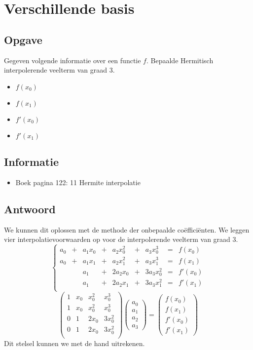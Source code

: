 \documentclass[examenvragen.tex]{subfiles}
\begin{document}
\section{Verschillende basis}
\subsection{Opgave}
Gegeven volgende informatie over een functie $f$. Bepaalde Hermitisch interpolerende veelterm van graad $3$.
\begin{multicols}{4}
\begin{itemize}
\item $f(x_0)$
\item $f(x_1)$
\item $f'(x_0)$
\item $f'(x_1)$
\end{itemize}
\end{multicols}
\subsection{Informatie}
\begin{itemize}
\item Boek pagina 122: 11 Hermite interpolatie
\end{itemize}

\subsection{Antwoord}
We kunnen dit oplossen met de methode der onbepaalde co\"effici\"enten. We leggen vier interpolatievoorwaarden op voor de interpolerende veelterm van graad $3$.
\[
\left\{
\begin{array}{ccccccccc}
a_0 &+& a_1x_0 &+& a_2x_0^{2} &+& a_3x_{0}^{3} &=& f(x_0)\\
a_0 &+& a_1x_1 &+& a_2x_1^{2} &+& a_3x_{1}^{3} &=& f(x_1)\\
&& a_1 &+& 2a_2x_0 &+& 3a_3x_{0}^{2} &=& f'(x_0)\\
&& a_1 &+& 2a_2x_1 &+& 3a_3x_{1}^{2} &=& f'(x_1)\\
\end{array}
\right.
\]
\[
\begin{pmatrix}
1 & x_0 & x_0^2 & x_0^3\\
1 & x_0 & x_0^2 & x_0^3\\
0 & 1 & 2x_0 & 3x_0^2\\
0 & 1 & 2x_0 & 3x_0^2\\
\end{pmatrix}
\begin{pmatrix}
a_0\\a_1\\a_2\\a_3
\end{pmatrix}
=
\begin{pmatrix}
f(x_0)\\f(x_1)\\f'(x_0)\\f'(x_1)
\end{pmatrix}
\]
Dit stelsel kunnen we met de hand uitrekenen.
\end{document}
